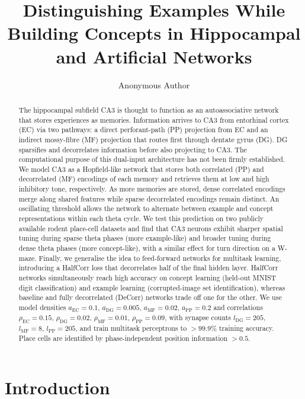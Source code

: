 \documentclass[11pt]{article}
\title{Distinguishing Examples While Building Concepts in Hippocampal and Artificial Networks}
\author[1]{Anonymous Author}
\affil[1]{Anonymous Institution}
\date{}
\begin{document}
\maketitle

\begin{abstract}
The hippocampal subfield CA3 is thought to function as an autoassociative network that stores experiences as memories. Information arrives to CA3 from entorhinal cortex (EC) via two pathways: a direct perforant-path (PP) projection from EC and an indirect mossy-fibre (MF) projection that routes first through dentate gyrus (DG). DG sparsifies and decorrelates information before also projecting to CA3. The computational purpose of this dual-input architecture has not been firmly established. We model CA3 as a Hopfield-like network that stores both correlated (PP) and decorrelated (MF) encodings of each memory and retrieves them at low and high inhibitory tone, respectively. As more memories are stored, dense correlated encodings merge along shared features while sparse decorrelated encodings remain distinct. An oscillating threshold allows the network to alternate between example and concept representations within each theta cycle. We test this prediction on two publicly available rodent place-cell datasets and find that CA3 neurons exhibit sharper spatial tuning during sparse theta phases (more example-like) and broader tuning during dense theta phases (more concept-like), with a similar effect for turn direction on a W-maze. Finally, we generalise the idea to feed-forward networks for multitask learning, introducing a HalfCorr loss that decorrelates half of the final hidden layer. HalfCorr networks simultaneously reach high accuracy on concept learning (held-out MNIST digit classification) and example learning (corrupted-image set identification), whereas baseline and fully decorrelated (DeCorr) networks trade off one for the other. We use model densities $a_{\mathrm{EC}} = 0.1$, $a_{\mathrm{DG}} = 0.005$, $a_{\mathrm{MF}} = 0.02$, $a_{\mathrm{PP}} = 0.2$ and correlations $\rho_{\mathrm{EC}} = 0.15$, $\rho_{\mathrm{DG}} = 0.02$, $\rho_{\mathrm{MF}} = 0.01$, $\rho_{\mathrm{PP}} = 0.09$, with synapse counts $l_{\mathrm{DG}} = 205$, $l_{\mathrm{MF}} = 8$, $l_{\mathrm{PP}} = 205$, and train multitask perceptrons to $>99.9\%$ training accuracy. Place cells are identified by phase-independent position information $>0.5$.
\end{abstract}

\section{Introduction}
\end{document}
